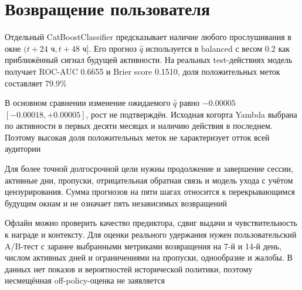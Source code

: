 \FloatBarrier
\section{Возвращение пользователя}

Отдельный CatBoostClassifier предсказывает наличие любого прослушивания
в окне \((t+24\text{ ч},t+48\text{ ч}]\).
Его прогноз \(\widehat q\) используется в balanced с весом 0.2
как приближённый сигнал будущей активности.
На реальных test-действиях модель получает ROC-AUC 0.6655
и Brier score 0.1510, доля положительных меток составляет 79.9\%

В основном сравнении изменение ожидаемого \(\widehat q\) равно
\(-0.00005\) \([-0.00018,+0.00005]\), рост не подтверждён.
Исходная когорта Yambda выбрана по активности в первых десяти месяцах
и наличию действия в последнем. Поэтому высокая доля положительных
меток не характеризует отток всей аудитории

Для более точной долгосрочной цели нужны продолжение и завершение
сессии, активные дни, пропуски, отрицательная обратная связь
и модель ухода с учётом цензурирования.
Сумма прогнозов на пяти шагах относится к перекрывающимся будущим окнам
и не означает пять независимых возвращений

Офлайн можно проверить качество предиктора, сдвиг выдачи
и чувствительность к награде и контексту.
Для оценки реального удержания нужен пользовательский A/B-тест
с заранее выбранными метриками возвращения на 7-й и 14-й день,
числом активных дней и ограничениями на пропуски, однообразие и жалобы.
В данных нет показов и вероятностей исторической политики,
поэтому несмещённая off-policy-оценка не заявляется
